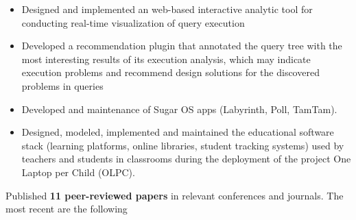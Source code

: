 \documentclass[10pt,a4paper]{altacv}
\begin{document}
\divider

\begin{itemize}
\item Designed and implemented an web-based interactive analytic tool for conducting real-time visualization of query execution
\item Developed a recommendation plugin that annotated the query tree with the most interesting results of its execution analysis, which may indicate execution problems and recommend design solutions for the discovered problems in queries
\end{itemize}

\divider

\begin{itemize} 	
\item Developed and maintenance of Sugar OS apps (Labyrinth, Poll, TamTam).
\item Designed, modeled, implemented and maintained the educational software stack (learning platforms, online libraries, student tracking systems) used by teachers and students in classrooms during the deployment of the project One Laptop per Child (OLPC).
\end{itemize}

%
     
     

Published \textbf{11 peer-reviewed papers} in relevant  conferences and journals. The most recent are the following

\nocite{*}



\printbibliography[heading=pubtype,title={\printinfo{\faFileTextO}{Journal Articles}}, type=article]


\printbibliography[heading=pubtype,title={\printinfo{\faGroup}{Conference Proceedings}},type=inproceedings]
\end{document}
